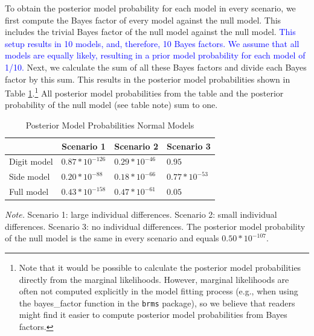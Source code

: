 \documentclass[
  english,
  doc,floatsintext]{apa6}
\begin{document}
To obtain the posterior model probability for each model in every scenario, we first compute the Bayes factor of every model against the null model. This includes the trivial Bayes factor of the null model against the null model. \textcolor{blue}{This setup results in 10 models, and, therefore, 10 Bayes factors. We assume that all models are equally likely, resulting in a prior model probability for each model of 1/10.} Next, we calculate the sum of all these Bayes factors and divide each Bayes factor by this sum. This results in the posterior model probabilities shown in Table \ref{tab:postmodprob}.\footnote{Note that it would be possible to calculate the posterior model probabilities directly from the marginal likelihoods. However, marginal likelihoods are often not computed explicitly in the model fitting process (e.g., when using the bayes\_factor function in the \texttt{brms} package), so we believe that readers might find it easier to compute posterior model probabilities from Bayes factors.} All posterior model probabilities from the table and the posterior probability of the null model (see table note) sum to one.

\begin{table}[H]
\caption{Posterior Model Probabilities Normal Models}
\label{tab:postmodprob}
\begin{tabularx}{\textwidth}{XXXX}
\toprule
 & \multicolumn{1}{c}{Scenario 1} & \multicolumn{1}{c}{Scenario 2} & \multicolumn{1}{c}{Scenario 3}\\
\midrule
Digit model & $0.87*10^{-126}$ & $0.29*10^{-46}$ & $0.95$\\
Side model & $0.20*10^{-88}$ & $0.18*10^{-66}$ & $0.77*10^{-53}$ \\
Full model & $0.43*10^{-158}$ & $0.47*10^{-61}$ & $0.05$\\
\bottomrule
\end{tabularx}
\begin{tablenotes}[para]
\textit{Note.} Scenario 1: large individual differences. Scenario 2: small individual differences. Scenario 3: no individual differences. The posterior model probability of the null model is the same in every scenario and equals $0.50*10^{-107}$. 
\end{tablenotes}
\end{table}
\end{document}
